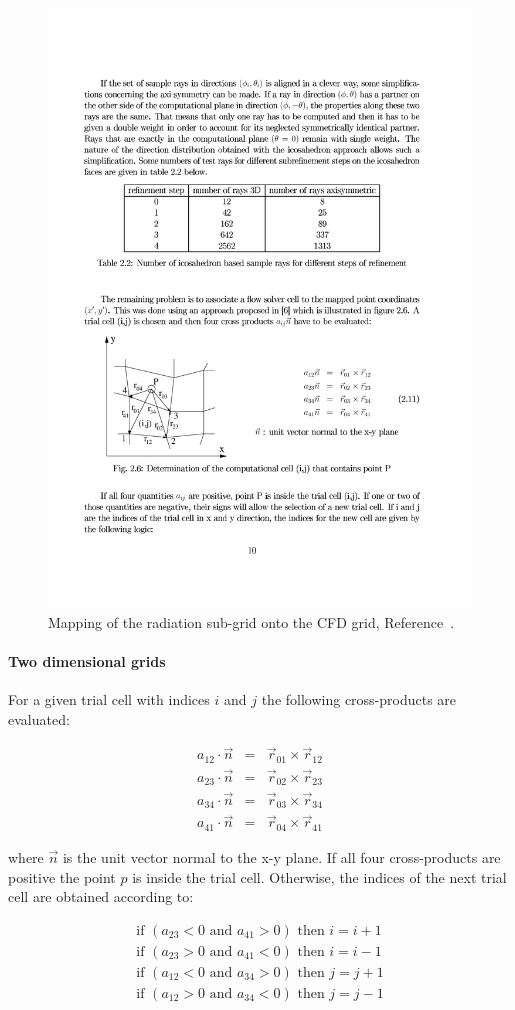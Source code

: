 \begin{figure}[ht]
 \centering
 \includegraphics[width=0.5\linewidth]{radiation/figures/cell_searching.pdf}
 \caption{Mapping of the radiation sub-grid onto the CFD grid, Reference~\cite{karl2001}.}
 \label{fig:cell-searching}
\end{figure}

\paragraph{Two dimensional grids}

For a given trial cell with indices $i$ and $j$ the following cross-products are evaluated:

\begin{eqnarray}
  a_{12} \cdot \vec{n} &=& \vec{r}_{01} \times \vec{r}_{12} \\
  a_{23} \cdot \vec{n} &=& \vec{r}_{02} \times \vec{r}_{23} \\
  a_{34} \cdot \vec{n} &=& \vec{r}_{03} \times \vec{r}_{34} \\
  a_{41} \cdot \vec{n} &=& \vec{r}_{04} \times \vec{r}_{41}
\end{eqnarray}

\noindent where $\vec{n}$ is the unit vector normal to the x-y plane.
If all four cross-products are positive the point $p$ is inside the trial cell.
Otherwise, the indices of the next trial cell are obtained according to:

\begin{eqnarray}
 \text{if } \left ( a_{23} < 0 \text{ and } a_{41} > 0 \right ) \text{ then } i = i + 1 \\ 
 \text{if } \left ( a_{23} > 0 \text{ and } a_{41} < 0 \right ) \text{ then } i = i - 1 \\
 \text{if } \left ( a_{12} < 0 \text{ and } a_{34} > 0 \right ) \text{ then } j = j + 1 \\
 \text{if } \left ( a_{12} > 0 \text{ and } a_{34} < 0 \right ) \text{ then } j = j - 1 
\end{eqnarray}


